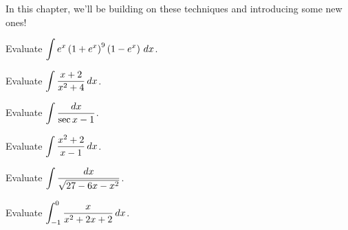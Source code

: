 \documentclass[12pt]{article}
\begin{document}
In this chapter, we'll be building on these techniques and introducing some new ones!

\newpage

\Example Evaluate $\displaystyle\int e^x\left(1+e^x\right)^9\left(1-e^x\right)\,dx$.

\vfill

\Example Evaluate $\displaystyle\int\frac{x+2}{x^2+4}\,dx$.

\vfill

\newpage 

\Example Evaluate $\displaystyle\int\frac{dx}{\sec x-1}$.

\newpage

\Example Evaluate $\displaystyle\int\frac{x^2+2}{x-1}\,dx$.

\newpage

\Example Evaluate $\displaystyle\int\frac{dx}{\sqrt{27-6x-x^2}}$.

\newpage

\Example Evaluate $\displaystyle\int_{-1}^0\frac{x}{x^2+2x+2}\,dx$.
\end{document}
